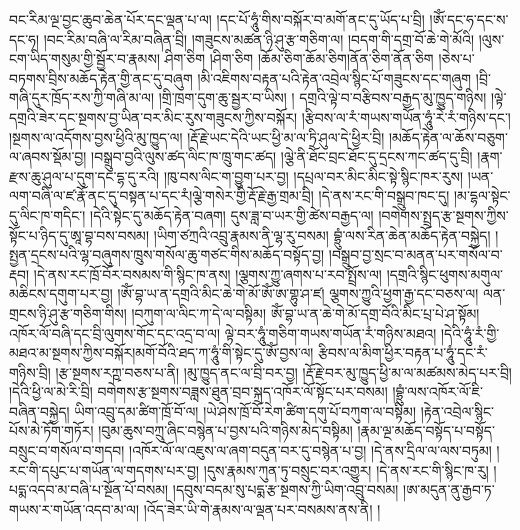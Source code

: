 བང་རིམ་ལྔ་བྱང་ཆུབ་ཆེན་པོར་དང་ལྡན་པ་ལ། །དང་པོ་ཧཱུཾ་གིས་བསྐོར་བ་མགོ་ནང་དུ་ཡོད་པ་བྲི། །ཨོཾ་དང་ཧ་དང་ས་དང་ཧ། །བང་རིམ་བཞི་ལ་རིམ་བཞིན་བྲི། །གཟུངས་མཚན་ཉི་ཤུ་རྩ་གཅིག་ལ། །བདག་གི་དགྲ་བོ་ཆེ་གེ་མོའི། །ལུས་ངག་ཡིད་གསུམ་གྱི་སྦྱོར་བ་རྣམས། ཤིག་ཅིག །ཤིག་ཅིག །ཆོམ་ཅིག་ཆོམ་ཅིག།ནོན་ཅིག་ནོན་ཅིག  །ཅེས་པ་བཏགས་བྲིས་མཆོད་རྟེན་གྱི་ནང་དུ་བཞུག །མི་འཇིགས་བརྟན་པའི་རྟེན་འབྲེལ་སྙིང་པོ་གཟུངས་དང་གཞུག །བྲི་གཞི་དུར་ཁྲོད་རས་ཀྱི་གཞི་མ་ལ། །གྲི་ཁྲག་དུག་ཆུ་སྦྱར་བ་ཡིས། ། དགྲའི་ལྟེ་བ་བརྩིབས་བརྒྱད་མུ་ཁྱུད་གཉིས། །ལྟེ་དགྲའི་ཟེར་དང་སྔགས་བྱ་ཡིན་བར་མིང་རུས་གཟུངས་ཀྱིས་བསྐོར། །རྩིབས་ལ་རཾ་གཡས་གཡོན་ཧཱུཾ་རེ་རཾ་གཉིས་དང་། །སྔགས་ལ་འདོགས་བྱས་ཕྱིའི་མུ་ཁྱུད་ལ། །རྡོ་རྗེ་ཡང་དེའི་ཡང་ཕྱི་མ་ལ་ཏྲི་ཤུལ་དེ་ཕྱིར་བྲི། །མཆོད་རྟེན་ལ་ཆོས་བཅུག་ལ་ཞབས་སྡོམ་བྱ། །བསྒྲུབ་བྱའི་ལུས་ཚད་ལིང་ཁ་ཁྲུ་གང་ཚད། །ལྕེ་ནི་ཐོང་བྲང་ཐོང་དུ་དྲངས་ཀང་ཚད་དུ་བྲི། །རྣག་རྫས་ཆུ་ཤུལ་པ་དུག་དང་དྷ་དུ་རའི། །ཁུ་བས་ལིང་ག་བྱུག་པར་བྱ། །དཔྲལ་བར་མིང་མིང་སྟེ་སྙིང་ཁར་རུས། །ཡན་ལག་བཞི་ལ་ཛ་རྣོ་ནང་དུ་བསྟན་པ་དང་རཾ།ལྕེ་གསེར་གྱི་རྡོ་རྗེ་རྒྱ་གྲམ་བྲི། །དེ་ནས་རང་གི་བསྒྲུབ་ཁང་དུ། །མ་དྷལ་སྟེང་དུ་ལིང་ཁ་གདིང་། །དེའི་སྟེང་དུ་མཆོད་རྟེན་བཞག། དུས་ཟླ་བ་ཡར་གྱི་ཚེས་བརྒྱད་ལ། །བགེགས་སྤྲད་རྩ་སྔགས་ཀྱིས་སྟོང་པ་ཉིད་དུ་ཨཱ་བྷ་བས་བསམ། །ཡིག་ཙཀྲའི་འབྲུ་རྣམས་ནི་ལྷ་རུ་བསམ། བྷྲུཾ་ལས་རིན་ཆེན་མཆོད་རྟེན་བསྐྱེད། །སྤྱན་དྲངས་པའི་ལྷ་བཞུགས་ཁྲུས་གསོལ་ཆུ་གཙང་གིས་མཆོད་བསྟོད་བྱ། །བསྒྲུབ་བྱ་སྲང་བ་མནན་པར་གསོལ་བ་རྡབ། །དེ་ནས་རང་ཁྲོ་བོར་བསམས་གི་སྙིང་ཁ་ནས། །ལྕགས་ཀྱུ་ཞགས་པ་རབ་སྤྲོས་ལ། །དགྲའི་སྙིང་ཕུགས་མགུལ་མཆིངས་དགུག་པར་བྱ། །ཨོཾ་བྷ་ཡ་ན་དགྲའི་མིང་ཆེ་གེ་མོ་ཨོཾ་ཨ་གྷུ་ཤ་ཛ། ལྕགས་ཀྱུའི་ཕྱག་རྒྱ་དང་བཅས་ལ། ལན་གྲངས་ཉི་ཤུ་རྩ་གཅིག་གིས། །བཀུག་ལ་ལིང་ཀ་དེ་ལ་བསྟིམ། ཨོཾ་བྷ་ཡ་ན་ཆེ་གེ་མོ་དགྲ་བོའི་མིང་པྲ་པེ་ཤ་སྟོམ། འཁོར་ལོ་བཞི་དང་བྲི་ལུགས་གོང་དང་འདྲ་བ་ལ། ལྟེ་བར་ཧཱུཾ་གཅིག་གཡས་གཡོན་རཾ་གཉིས་མཐའ། །དེའི་ཧཱུཾ་རཾ་གྱི་མཐའ་མ་སྔགས་ཀྱིས་བསྐོར།མགོ་བོའི་ཐད་ཀ་ཧཱུཾ་གི་སྟེང་དུ་ཨོཾ་བྱས་ལ། རྩིབས་ལ་མིག་ཕྱིར་བརྟན་པ་ཧཱུཾ་དང་རཾ་གཉིས་བྲི། །རྩ་སྔགས་རཀྵ་བཅས་པ་ནི། །མུ་ཁྱུད་ནང་ལ་བྲི་བར་བྱ། །རྡོ་རྗེ་བར་མུ་ཁྱུད་ཕྱི་མ་ལ་མཚམས་མེད་པར་བྲི། །དེའི་ཕྱི་ལ་མེ་རི་བྲི། བགེགས་རྩ་སྔགས་བཟླས་ཐུན་བྲབ་སྐྲད་འཁོར་ལོ་སྟོང་པར་བསམ། །བྷྲུཾ་ལས་འཁོར་ལོ་ཇི་བཞིན་བསྐྱེད། ཡིག་འབྲུ་དམ་ཚིག་ཁྲོ་བོ་ལ། །ཡེ་ཤེས་ཁྲོ་བོ་རེག་ཚིག་དགུ་པོ་བཀུག་ལ་བསྟིམ། །རྟེན་འབྲེལ་སྙིང་པོས་མེ་ཏོག་གཏོར། །བུམ་ཆུས་བཀྲུ་ཞིང་བསྙེན་པ་བྱས་པའི་གཉིས་མེད་བསྟིམ། །རྣམ་ལྔ་མཆོད་བསྟོད་པ་བསྟོད་བསྲུང་བ་གསོལ་བ་གདབ། །འཁོར་ལོ་ལ་འཇུས་ལ་ཞག་བདུན་བར་དུ་བསྙེན་པ་བྱ། །དེ་ནས་དྲིལ་ལ་ལས་བཏུམ། །རང་གི་དཔུང་པ་གཡོན་ལ་གདགས་པར་བྱ། །དུས་རྣམས་ཀུན་ཏུ་བསྲུང་བར་འགྱུར། །དེ་ནས་རང་གི་སྙིང་ཁ་རུ། །པདྨ་འདབ་མ་བཞི་པ་སྔོན་པོ་བསམ། །དབུས་བདམ་སུ་པདྨ་རྩ་སྔགས་ཀྱི་ཡིག་འབྲུ་བསམ། །ཨ་མདུན་ནུ་རྒྱབ་ཏ་གཡས་ར་གཡོན་འདབ་མ་ལ། །འོད་ཟེར་ཡི་གེ་རྣམས་ལ་ལྡན་པར་བསམས་ནས་ནི། །
